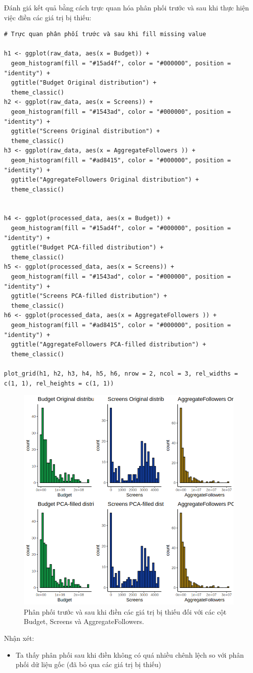 Đánh giá kết quả bằng cách trực quan hóa phân phối trước và sau khi thực hiện việc điền các giá trị bị thiếu:
\begin{lstlisting}
# Trực quan phân phối trước và sau khi fill missing value

h1 <- ggplot(raw_data, aes(x = Budget)) +
  geom_histogram(fill = "#15ad4f", color = "#000000", position = "identity") +
  ggtitle("Budget Original distribution") +
  theme_classic()
h2 <- ggplot(raw_data, aes(x = Screens)) +
  geom_histogram(fill = "#1543ad", color = "#000000", position = "identity") +
  ggtitle("Screens Original distribution") +
  theme_classic()
h3 <- ggplot(raw_data, aes(x = AggregateFollowers )) +
  geom_histogram(fill = "#ad8415", color = "#000000", position = "identity") +
  ggtitle("AggregateFollowers Original distribution") +
  theme_classic()

  
h4 <- ggplot(processed_data, aes(x = Budget)) +
  geom_histogram(fill = "#15ad4f", color = "#000000", position = "identity") +
  ggtitle("Budget PCA-filled distribution") +
  theme_classic()
h5 <- ggplot(processed_data, aes(x = Screens)) +
  geom_histogram(fill = "#1543ad", color = "#000000", position = "identity") +
  ggtitle("Screens PCA-filled distribution") +
  theme_classic()
h6 <- ggplot(processed_data, aes(x = AggregateFollowers )) +
  geom_histogram(fill = "#ad8415", color = "#000000", position = "identity") +
  ggtitle("AggregateFollowers PCA-filled distribution") +
  theme_classic()

plot_grid(h1, h2, h3, h4, h5, h6, nrow = 2, ncol = 3, rel_widths = c(1, 1), rel_heights = c(1, 1))
\end{lstlisting}

\begin{figure}[H]
    \centering
    \includegraphics[width=0.75\columnwidth]{csm_figures/imputed_PCA.png}
    \caption{Phân phối trước và sau khi điền các giá trị bị thiếu đối với các cột Budget, Screens và AggregateFollowers.}
    \label{fig:imputed_PCA}
\end{figure}
Nhận xét:
\begin{itemize}
    \item Ta thấy phân phối sau khi điền không có quá nhiều chênh lệch so với phân phối dữ liệu gốc (đã bỏ qua các giá trị bị thiếu)
\end{itemize}

